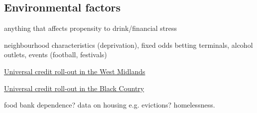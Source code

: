 \documentclass[12pt, letterpaper]{article}
\begin{document}
\subsection{Environmental factors}

anything that affects propensity to drink/financial stress

neighbourhood characteristics (deprivation), fixed odds betting terminals, alcohol outlets, events (football, festivals)

\href{https://www.birminghammail.co.uk/news/midlands-news/universal-credit-rolled-out-across-14142901}{Universal credit roll-out in the West Midlands}

\href{https://www.birminghammail.co.uk/black-country/universal-credit-claimants-black-country-15946831}{Universal credit roll-out in the Black Country}


food bank dependence? data on housing e.g. evictions? homelessness.

\newpage



\end{document}
